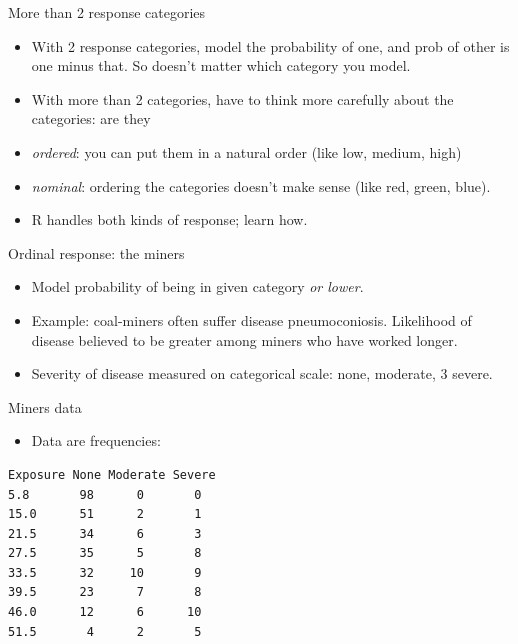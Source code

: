 \documentclass[ignorenonframetext,]{beamer}
\providecommand{\tightlist}{%
  \setlength{\itemsep}{0pt}\setlength{\parskip}{0pt}}
\begin{document}
\begin{frame}{More than 2 response categories}
\protect\hypertarget{more-than-2-response-categories}{}

\begin{itemize}
\item
  With 2 response categories, model the probability of one, and prob of
  other is one minus that. So doesn't matter which category you model.
\item
  With more than 2 categories, have to think more carefully about the
  categories: are they
\item
  \emph{ordered}: you can put them in a natural order (like low, medium,
  high)
\item
  \emph{nominal}: ordering the categories doesn't make sense (like red,
  green, blue).
\item
  R handles both kinds of response; learn how.
\end{itemize}

\end{frame}

\begin{frame}{Ordinal response: the miners}
\protect\hypertarget{ordinal-response-the-miners}{}

\begin{itemize}
\item
  Model probability of being in given category \emph{or lower}.
\item
  Example: coal-miners often suffer disease pneumoconiosis. Likelihood
  of disease believed to be greater among miners who have worked longer.
\item
  Severity of disease measured on categorical scale: none, moderate, 3
  severe.
\end{itemize}

\end{frame}

\begin{frame}[fragile]{Miners data}
\protect\hypertarget{miners-data}{}

\begin{itemize}
\tightlist
\item
  Data are frequencies:
\end{itemize}

\begin{verbatim}
Exposure None Moderate Severe
5.8       98      0       0
15.0      51      2       1
21.5      34      6       3
27.5      35      5       8
33.5      32     10       9
39.5      23      7       8
46.0      12      6      10
51.5       4      2       5
\end{verbatim}

\end{frame}
\end{document}
